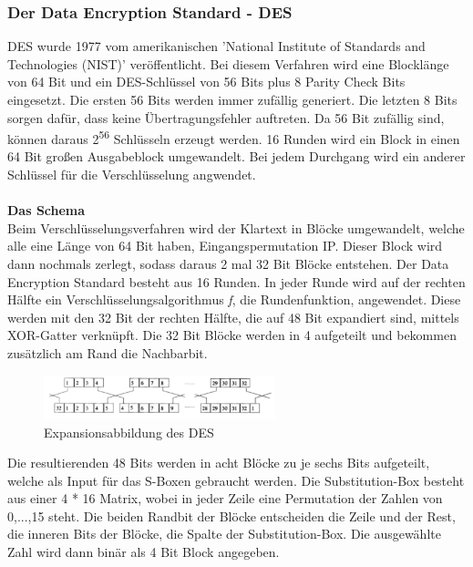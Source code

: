 \documentclass[11pt]{scrartcl}
\begin{document}
\subsubsection{Der Data Encryption Standard - DES}
\label{sec:data-encryotion-standard}
\grqq{}DES wurde 1977 vom amerikanischen 'National Institute of Standards and Technologies (NIST)' veröffentlicht.\grqq{}\cite{1} Bei diesem Verfahren wird eine Blocklänge von 64 Bit und ein DES-Schlüssel von 56 Bits plus 8 \grqq{}Parity Check Bits\grqq{}\cite{1} eingesetzt. Die ersten 56 Bits werden immer zufällig generiert. Die letzten 8 Bits sorgen dafür, dass keine Übertragungsfehler auftreten. Da 56 Bit zufällig sind, können daraus 2\textsuperscript{56} Schlüsseln erzeugt werden. 16 Runden wird ein Block in einen 64 Bit großen Ausgabeblock umgewandelt. Bei jedem Durchgang wird ein anderer Schlüssel für die Verschlüsselung angwendet. \cite{1}\cite{4}\\\\
\noindent \textbf{Das Schema}\\
Beim Verschlüsselungsverfahren wird der Klartext in Blöcke umgewandelt, welche alle eine Länge von 64 Bit haben, Eingangspermutation IP. Dieser Block wird dann nochmals zerlegt, sodass daraus 2 mal 32 Bit Blöcke entstehen. Der Data Encryption Standard besteht aus 16 Runden. In jeder Runde wird auf der rechten Hälfte ein Verschlüsselungsalgorithmus \textit{f}, die Rundenfunktion, angewendet. Diese werden mit den 32 Bit der rechten Hälfte, die auf 48 Bit expandiert sind, mittels XOR-Gatter verknüpft. Die 32 Bit Blöcke werden in 4 aufgeteilt und bekommen zusätzlich am Rand die Nachbarbit. \cite{2}\\
\begin{figure}[H]
\includegraphics[width=0.60\textwidth]{Bilder/DES/DES_Expansionsabbildung}
	\caption{Expansionsabbildung des DES \cite{2}}
	\label{fig1}
\end{figure}
\noindent \grqq{}Die resultierenden 48 Bits werden in acht Blöcke zu je sechs Bits aufgeteilt\grqq{}\cite{2}, welche als Input für das S-Boxen gebraucht werden. Die Substitution-Box besteht aus einer 4 * 16 Matrix, \grqq{}wobei in jeder Zeile eine Permutation der Zahlen von 0,...,15 steht.\grqq{}\cite{2} Die beiden Randbit der Blöcke entscheiden die Zeile und der Rest, die inneren Bits der Blöcke, die Spalte der Substitution-Box. Die ausgewählte Zahl wird dann binär als 4 Bit Block angegeben. \cite{2}
\end{document}

